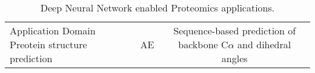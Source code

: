 \begin{table}[h!]
\centering
\begin{tabular}{||l|c|c||}
    \hline
    Application Domain
    Preotein structure prediction & AE & Sequence-based prediction of backbone C$\alpha$ and dihedral angles 
    \hline
\end{tabular}
\caption{Deep Neural Network enabled Proteomics applications.}
\label{tab:PS-DNN}
\end{table}